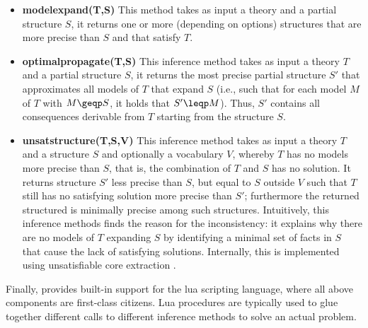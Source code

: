 \begin{itemize}
 \item \textbf{modelexpand(T,S)} This method takes as input a theory and a partial structure $S$, it returns one or more (depending on options) structures that are more precise than $S$ and that satisfy $T$.
 \item \textbf{optimalpropagate(T,S)} This inference method takes as input a theory $T$ and a partial structure $S$, it returns the most precise partial structure $S'$ that approximates all models of $T$ that expand $S$ (i.e., such that for each model $M$ of $T$ with $M\geqp S$, it holds that $S'\leqp M$). Thus, $S'$ contains all consequences derivable from $T$ starting from the structure $S$.
 \item \textbf{unsatstructure(T,S,V)} This inference method takes as input a theory $T$ and a structure $S$ and optionally a vocabulary $V$, whereby $T$ has no models more precise than  $S$, that is, the combination of $T$ and $S$ has no solution. It returns structure $S'$ less precise than $S$, but equal to $S$ outside $V$ such that $T$ still has no satisfying solution more precise than $S'$; furthermore the returned structured is minimally precise among such structures. Intuitively, this inference methods finds the reason for the inconsistency: it explains why there are no models of $T$ expanding $S$ by identifying a minimal set of facts in $S$ that cause the lack of satisfying solutions. 
 Internally, this is implemented using unsatisfiable core extraction \cite{conf/sat/LynceM04}. 
\end{itemize}
Finally, \idp provides built-in support for the lua scripting language, where all above components are first-class citizens. Lua procedures are typically used to glue together different calls to different inference methods to solve an actual problem.

